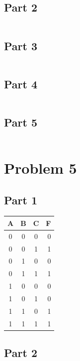 \documentclass[paper=a4, fontsize=11pt]{scrartcl} %
\numberwithin{equation}{section} %
\numberwithin{figure}{section} %
\numberwithin{table}{section} %
\begin{document}
\subsection{Part 2}
\inputminted{vhdl}{src/p4-1-2/p4-2.vhd}
\subsection{Part 3}
\inputminted{vhdl}{src/p4-3/p4-3.vhd}
\subsection{Part 4}
\inputminted{vhdl}{src/p4-4/p4-4.vhd}
\subsection{Part 5}
\inputminted{vhdl}{src/p4-5/p4-5.vhd}


\section{Problem 5}
\subsection{Part 1}
\begin{center}
	\begin{tabular}{c | c | c || r}
		A & B & C & F \\
		\hline
		0 & 0 & 0 & 0 \\
		\hline
		0 & 0 & 1 & 1 \\
		\hline
		0 & 1 & 0 & 0 \\
		\hline
		0 & 1 & 1 & 1 \\
		\hline
		1 & 0 & 0 & 0 \\
		\hline
		1 & 0 & 1 & 0 \\
		\hline
		1 & 1 & 0 & 1 \\
		\hline
		1 & 1 & 1 & 1 \\
		\hline
	\end{tabular}
\end{center}
\subsection{Part 2}
\inputminted{vhdl}{src/p5-2/p5-2.vhd}
\end{document}
